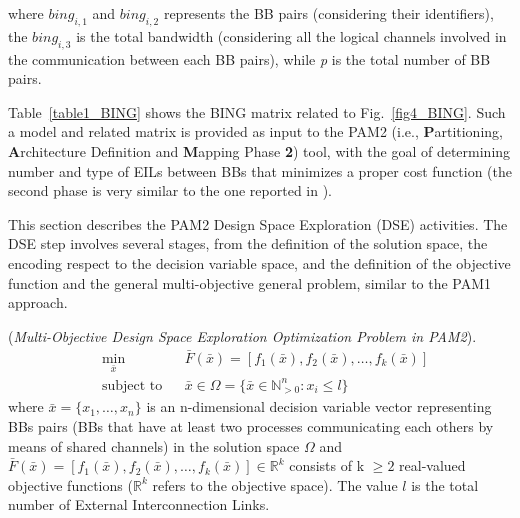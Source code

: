 %
where ${bing}_{i,1}$ and ${bing}_{i,2}$ represents the BB pairs (considering their identifiers), the ${bing}_{i,3}$ is the total bandwidth (considering all the logical channels involved in the communication between each BB pairs), while \textit{p} is the total number of BB pairs. \par
%
\begin{table}[htbp]
\caption{BING matrix related to Fig.~\ref{fig4_BING}.}
\begin{center}
\label{table1_BING}
\end{center}
\end{table}
%
Table~\ref{table1_BING} shows the BING matrix related to Fig.~\ref{fig4_BING}. Such a model and related matrix is provided as input to the PAM2 (i.e., \textbf{P}artitioning, \textbf{A}rchitecture Definition and \textbf{M}apping Phase \textbf{2}) tool, with the goal of determining number and type of EILs between BBs that minimizes a proper cost function (the second phase is very similar to the one reported in \cite{bib22}).\par
This section describes the PAM2 Design Space Exploration (DSE) activities. The DSE step involves several stages, from the definition of the solution space, the encoding respect to the decision variable space, and the definition of the objective function and the general multi-objective general problem, similar to the PAM1 approach.%
%
\theoremstyle{definition}
\begin{definition}{(\textit{Multi-Objective Design Space Exploration Optimization Problem in PAM2}).}
%
\begin{equation} \label{equation128_PAM2}
  \begin{aligned}
    & \underset{\bar x}{\text{min}} &  & \bar F(\bar x) = [f_1(\bar x), f_2(\bar x), \ldots , f_k(\bar x)] \\
    & \text{subject to}             &  & \bar x \in \Omega = \{ \bar x  \in \mathbb{N}_{> 0}^{n} : x_i \leq l \}
\end{aligned}
\end{equation}
%
where $\bar x = \{x_1,\ldots, x_n\}$ is an n-dimensional decision variable vector representing BBs pairs (BBs that have at least two processes communicating each others by means of shared channels) in the solution space $\Omega$ and $\bar F(\bar x) = [f_1(\bar x), f_2(\bar x), \ldots , f_k(\bar x)] \in \mathbb{R}^k$ consists of k $\geq 2$ real-valued objective functions ($\mathbb{R}^k$ refers to the objective space). The value $l$ is the total number of External Interconnection Links. \par
%
\end{definition}
